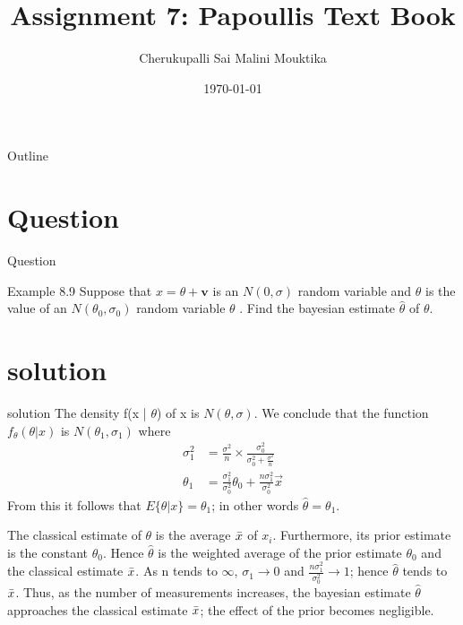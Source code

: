 \documentclass{beamer}
\title{Assignment 7: Papoullis Text Book}
\author{Cherukupalli Sai Malini Mouktika}
\date{\today}
\numberwithin{equation}{subsection}
\begin{document}
\begin{frame}
    \titlepage 
\end{frame}

\logo{}

\begin{frame}{Outline}
    \tableofcontents
\end{frame}
\section{Question}
\begin{frame}{Question}
    \begin{block}{Example 8.9}
Suppose that $x = \theta + \textbf{v}$ is an $N (0, \sigma)$ random variable and $\theta$ is the value of 
an $N(\theta _{0} , \sigma _{0})$ random variable $\theta$ . Find the bayesian estimate $\hat{\theta}$ of $\theta$.
\end{block}
\end{frame}
\section{solution}
\begin{frame}{solution}
The density f(x | $\theta$) of x is $N(\theta , \sigma)$. We conclude that the function $f_{\theta}(\theta | x)$ is $N(\theta _{1} , \sigma _{1})$ where \\
\begin{align}
    \sigma_{1}^{2} &= \frac{\sigma ^{2}}{n} \times \frac{\sigma_{0}^{2}}{\sigma_{0}^{2} + \frac{\sigma ^{2}}{n}} \\
    \theta _{1} &= \frac{\sigma_{1}^{2}}{\sigma_{0}^{2}}\theta _{0} + \frac{n\sigma_{1}^{2}}{\sigma_{0}^{2}}\vec{x}
\end{align}
From this it follows that $E \lbrace\theta | x\rbrace = \theta _{1}$; in other words $\hat{\theta} = \theta _{1}$.
\end{frame}
\begin{frame}
The classical estimate of $\theta$ is the average $\Bar{x}$ of $x_{i}$. Furthermore, its prior 
estimate is the constant $\theta _{0}$. Hence $\hat{\theta}$ is the weighted average of the prior estimate $\theta _{0}$ and the classical estimate $\Bar{x}$. As n tends to $\infty$, $\sigma _{1} \rightarrow 0$ and $\frac{n\sigma_{1}^{2}}{\sigma_{0}^{2}} \rightarrow 1$; hence $\hat{\theta}$ tends to $\Bar{x}$. Thus, as the number of measurements increases, the bayesian estimate $\hat{\theta}$ approaches the classical estimate $\Bar{x}$; the effect of the prior becomes negligible.
\end{frame}
\end{document}
